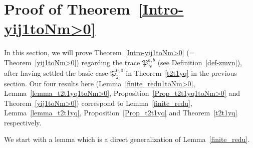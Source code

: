 \documentclass[12pt, reqno]{amsart}
\theoremstyle{definition}
\theoremstyle{remark}
\numberwithin{equation}{section}
\numberwithin{equation}{section}
\begin{document}
\section{\bf Proof of Theorem~\ref{Intro-yij1toNm>0}} 
\label{sect_mpositive}

In this section, we will prove Theorem~\ref{Intro-yij1toNm>0} 
(= Theorem~\ref{yij1toNm>0}) regarding the trace $\mathfrak P_{N}^{a,b}$ 
(see Definition~\ref{def-zmvn}), after having settled the basic case 
$\mathfrak P_{2}^{0,0}$ in Theorem~\ref{t2t1yq} in the previous section. 
Our four results here (Lemma~\ref{finite_redu1toNm>0}, 
Lemma~\ref{lemma_t2t1yq1toNm>0}, Proposition~\ref{Prop_t2t1yq1toNm>0} 
and Theorem~\ref{yij1toNm>0})
correspond to Lemma~\ref{finite_redu}, Lemma~\ref{lemma_t2t1yq}, 
Proposition~\ref{Prop_t2t1yq} and Theorem~\ref{t2t1yq} respectively. 

We start with a lemma which is a direct generalization of 
Lemma~\ref{finite_redu}.
\end{document}
